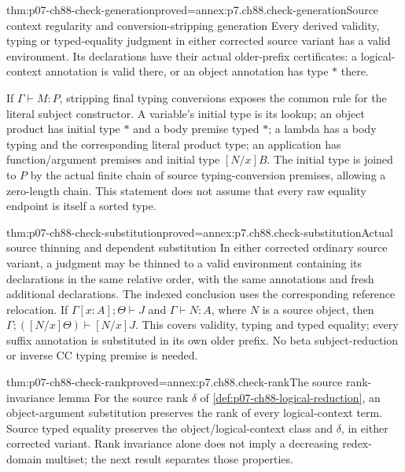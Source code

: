\begin{hblemma}{thm:p07-ch88-check-generation}{proved=annex:p7.ch88.check-generation}{Source context regularity and conversion-stripping generation}
Every derived validity, typing or typed-equality judgment in either
corrected source variant has a valid environment. Its declarations have
their actual older-prefix certificates: a logical-context annotation is
valid there, or an object annotation has type \(\ast\) there.

If \(\Gamma\vdash M:P\), stripping final typing conversions exposes
the common rule for the literal subject constructor. A variable's initial
type is its lookup; an object product has initial type \(\ast\) and a
body premise typed \(\ast\); a lambda has a body typing and the
corresponding literal product type; an application has function/argument
premises and initial type \([N/x]B\). The initial type is joined to
\(P\) by the actual finite chain of source typing-conversion premises,
allowing a zero-length chain. This statement does not assume that every
raw equality endpoint is itself a sorted type.
\end{hblemma}

\begin{hbtheorem}{thm:p07-ch88-check-substitution}{proved=annex:p7.ch88.check-substitution}{Actual source thinning and dependent substitution}
In either corrected ordinary source variant, a judgment may be thinned
to a valid environment containing its declarations in the same relative
order, with the same annotations and fresh additional declarations.
The indexed conclusion uses the corresponding reference relocation.
If \(\Gamma[x:A];\Theta\vdash J\) and \(\Gamma\vdash N:A\),
where \(N\) is a source object, then
\(\Gamma;([N/x]\Theta)\vdash[N/x]J\). This covers validity, typing
and typed equality; every suffix annotation is substituted in its own
older prefix. No beta subject-reduction or inverse CC typing premise
is needed.
\end{hbtheorem}

\begin{hblemma}{thm:p07-ch88-check-rank}{proved=annex:p7.ch88.check-rank}{The source rank-invariance lemma}
For the source rank \(\delta\) of
\cref{def:p07-ch88-logical-reduction}, an object-argument substitution
preserves the rank of every logical-context term. Source typed equality
preserves the object/logical-context class and \(\delta\), in either
corrected variant. Rank invariance alone does not imply a decreasing
redex-domain multiset; the next result separates those properties.
\end{hblemma}

